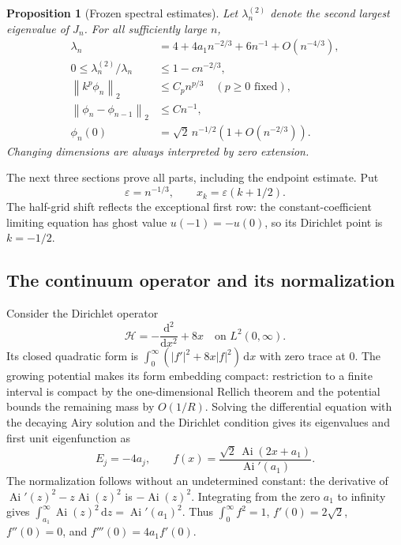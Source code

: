 \documentclass[11pt,letterpaper]{article}
\numberwithin{equation}{section}
\newtheorem{proposition}[theorem]{Proposition}
\theoremstyle{remark}
\newcommand{\Ai}{\operatorname{Ai}}
\newcommand{\norm}[1]{\left\lVert#1\right\rVert}
\newcommand{\eps}{\varepsilon}
\begin{document}
\begin{proposition}[Frozen spectral estimates]\label{air:jp:rb:prop:frozen}
Let $\lambda_n^{(2)}$ denote the second largest eigenvalue of $J_n$. For all sufficiently large $n$,
\begin{align}
 \lambda_n&=4+4a_1n^{-2/3}+6n^{-1}+O(n^{-4/3}),\label{air:jp:rb:eq:eigen}\\
 0\le\lambda_n^{(2)}/\lambda_n&\le1-cn^{-2/3},\label{air:jp:rb:eq:gap}\\
 \norm{k^p\phi_n}_2&\le C_pn^{p/3}\quad(p\ge0\text{ fixed}),\label{air:jp:rb:eq:moments}\\
 \norm{\phi_n-\phi_{n-1}}_2&\le Cn^{-1},\label{air:jp:rb:eq:drift}\\
 \phi_n(0)&=\sqrt2\,n^{-1/2}\left(1+O(n^{-2/3})\right).\label{air:jp:rb:eq:endpoint}
\end{align}
Changing dimensions are always interpreted by zero extension.
\end{proposition}
The next three sections prove all parts, including the endpoint estimate. Put
\[
 \eps=n^{-1/3},\qquad x_k=\eps(k+1/2).
\]
The half-grid shift reflects the exceptional first row: the constant-coefficient limiting equation has ghost value $u(-1)=-u(0)$, so its Dirichlet point is $k=-1/2$.

\subsection{The continuum operator and its normalization}
Consider the Dirichlet operator
\[
 \mathcal H=-\frac{\mathrm d^2}{\mathrm dx^2}+8x\quad\text{on }L^2(0,\infty).
\]
Its closed quadratic form is $\int_0^\infty(|f'|^2+8x|f|^2)\,\mathrm d x$ with zero trace at $0$. The growing potential makes its form embedding compact: restriction to a finite interval is compact by the one-dimensional Rellich theorem and the potential bounds the remaining mass by $O(1/R)$. Solving the differential equation with the decaying Airy solution and the Dirichlet condition gives its eigenvalues and first unit eigenfunction as
\begin{equation}\label{air:jp:rb:eq:continuum}
 E_j=-4a_j,\qquad
 f(x)=\frac{\sqrt2\,\Ai(2x+a_1)}{\Ai'(a_1)}.
\end{equation}
The normalization follows without an undetermined constant: the derivative of
$\Ai'(z)^2-z\Ai(z)^2$ is $-\Ai(z)^2$. Integrating from the zero $a_1$ to infinity gives
$\int_{a_1}^\infty\Ai(z)^2\,\mathrm d z=\Ai'(a_1)^2$.
Thus $\int_0^\infty f^2=1$, $f'(0)=2\sqrt2$, $f''(0)=0$, and $f'''(0)=4a_1f'(0)$.
\end{document}

